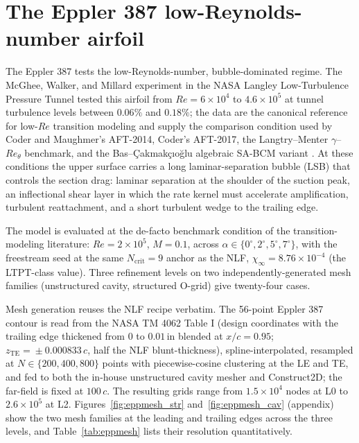 \documentclass[journal]{new-aiaa}
\begin{document}
\section{The Eppler 387 low-Reynolds-number airfoil}\label{sec:eppval}

The Eppler 387 tests the low-Reynolds-number,
bubble-dominated regime. The McGhee, Walker, and Millard experiment in
the NASA Langley Low-Turbulence Pressure Tunnel \cite{mcghee_1988} tested this
airfoil from $Re\!=\!6\!\times\!10^4$ to $4.6\!\times\!10^5$ at tunnel
turbulence levels between $0.06\%$ and $0.18\%$; the data are the canonical
reference for low-$Re$ transition modeling and supply the comparison condition
used by Coder and Maughmer's AFT-2014, Coder's AFT-2017, the Langtry--Menter
$\gamma$--$Re_\theta$ benchmark, and the Bas--{\c C}akmak{\c c}{\i}o{\u g}lu
algebraic SA-BCM variant
\cite{coder_maughmer_2014, halila_2022, langtry_menter_2009, cakmakcioglu_2018}.
At these conditions the upper surface carries a long laminar-separation bubble
(LSB) that controls the section drag: laminar separation at the shoulder of the
suction peak, an inflectional shear layer in which the rate kernel must
accelerate amplification, turbulent reattachment, and a short turbulent wedge
to the trailing edge.

The model is evaluated at the de-facto benchmark condition of the
transition-modeling literature: $Re\!=\!2\!\times\!10^5$, $M\!=\!0.1$, across
$\alpha\!\in\!\{0^\circ,2^\circ,5^\circ,7^\circ\}$, with the freestream seed at
the same $N_\mathrm{crit}\!=\!9$ anchor as the NLF,
$\chi_\infty\!=\!8.76\!\times\!10^{-4}$ (the LTPT-class value). Three
refinement levels on two independently-generated mesh families
(unstructured cavity, structured O-grid) give twenty-four cases.

Mesh generation reuses the NLF recipe verbatim. The 56-point Eppler 387
contour is read from the NASA TM 4062 Table I (design coordinates with the
trailing edge thickened from $0$ to $0.01\,\mathrm{in}$ blended at
$x/c\!=\!0.95$; $z_\mathrm{TE}\!=\!\pm0.000833\,c$, half the NLF
blunt-thickness), spline-interpolated, resampled at $N\!\in\!\{200,400,800\}$
points with piecewise-cosine clustering at the LE and TE, and fed to both the
in-house unstructured cavity mesher and Construct2D; the far-field is fixed at
$100\,c$. The resulting grids range
from $1.5\!\times\!10^4$ nodes at L0 to $2.6\!\times\!10^5$ at L2.
Figures~\ref{fig:eppmesh_str} and~\ref{fig:eppmesh_cav} (appendix) show the
two mesh families at the leading and trailing edges across the three levels,
and Table~\ref{tab:eppmesh} lists their resolution quantitatively.
\end{document}
